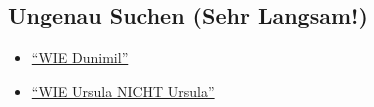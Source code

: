 \documentclass[a4paper,10pt]{article}
\newcommand{\link}{http://myserver.org/documents}
\newcommand{\searchlink}[1]{\href{\link/#1}{``#1''}}
\begin{document}
\subsection{Ungenau Suchen (Sehr Langsam!)}

\begin{itemize}
	\item \searchlink{WIE Dunimil}
	\item \searchlink{WIE Ursula NICHT Ursula}
\end{itemize}
\end{document}
